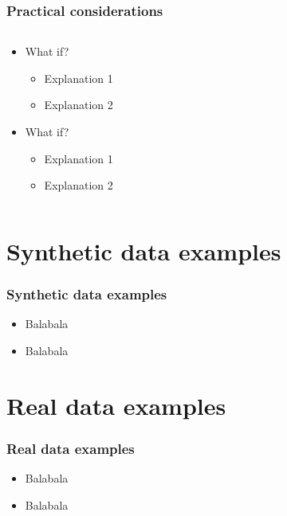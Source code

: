 \begin{frame}\frametitle{Practical considerations}
  \begin{columns}[T]
    \begin{column}{.6\textwidth}
     \begin{block}{}
\begin{center}
\begin{itemize}
\item What if?
\begin{itemize}
\item Explanation 1
\item Explanation 2
\end{itemize}
\item What if?
\begin{itemize}
\item Explanation 1
\item Explanation 2
\end{itemize}
\end{itemize}
\end{center}
    \end{block}
    \end{column}
    \begin{column}{.4\textwidth}
    \begin{block}{}
    \end{block}
    \end{column}
  \end{columns}
\end{frame} 

\section{Synthetic data examples}
\begin{frame}\frametitle{Synthetic data examples}
\begin{center}
\begin{itemize}
\item Balabala
\item Balabala
\end{itemize}
\end{center}
\end{frame}

\section{Real data examples}
\begin{frame}\frametitle{Real data examples}
\begin{center}
\begin{itemize}
\item Balabala
\item Balabala
\end{itemize}
\end{center}
\end{frame}

